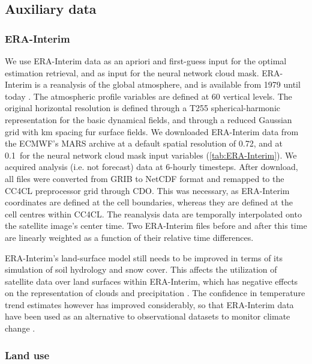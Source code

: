 \subsection{Auxiliary data}

\subsubsection{ERA-Interim}\label{sec:ERA-Interim}

We use ERA-Interim data as an apriori and first-guess input for the optimal estimation retrieval, and as input for the neural network cloud mask. ERA-Interim is a reanalysis of the global atmosphere, and is available from 1979 until today \citep{ERAInterim,Dee11}. The atmospheric profile variables are defined at 60 vertical levels. The original horizontal resolution is defined through a T255 spherical-harmonic representation for the basic dynamical fields, and through a reduced Gaussian grid with  km spacing fur surface fields. We downloaded ERA-Interim data from the ECMWF's MARS archive at a default spatial resolution of 0.72\textdegree, and at 0.1\textdegree\ for the neural network cloud mask input variables (\autoref{tab:ERA-Interim}). We acquired analysis (i.e. not forecast) data at 6-hourly timesteps. After download, all files were converted from GRIB to NetCDF format and remapped to the CC4CL preprocessor grid through CDO. This was necessary, as ERA-Interim coordinates are defined at the cell boundaries, whereas they are defined at the cell centres within CC4CL. The reanalysis data are temporally interpolated onto the satellite image's center time. Two ERA-Interim files before and after this time are linearly weighted as a function of their relative time differences.

ERA-Interim's land-surface model still needs to be improved in terms of its simulation of soil hydrology and snow cover. This affects the utilization of satellite data over land surfaces within ERA-Interim, which has negative effects on the representation of clouds and precipitation \citep{ERAInterim}. The confidence in temperature trend estimates however has improved considerably, so that ERA-Interim data have been used as an alternative to observational datasets to monitor climate change \citep{Willett10}.

\subsubsection{Land use}\label{sec:USGS}

